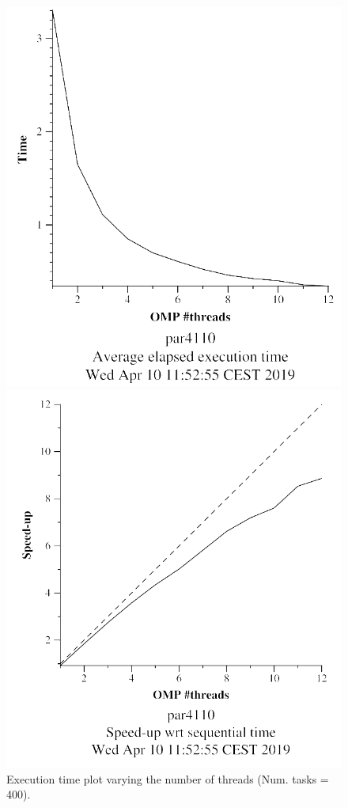 \documentclass[12pt, a4paper]{article}
\begin{document}
\begin{figure}[H]
\centering
\begin{minipage}[b]{0.4\linewidth}
  \centering
  \includegraphics[scale=0.5]{./mandel-omp-10000-strong-omp-3-400-time}
  \caption{Execution time plot varying the number of threads (Num. tasks = 400).}
  \label{fig:mandel-omp-10000-strong-omp-3-400-time}
\end{minipage}%
\hspace{0.5cm}
\begin{minipage}[b]{0.4\linewidth}
  \centering
  \includegraphics[scale=0.5]{./mandel-omp-10000-strong-omp-3-400-speedup}

\end{minipage}
\end{figure}
\end{document}
